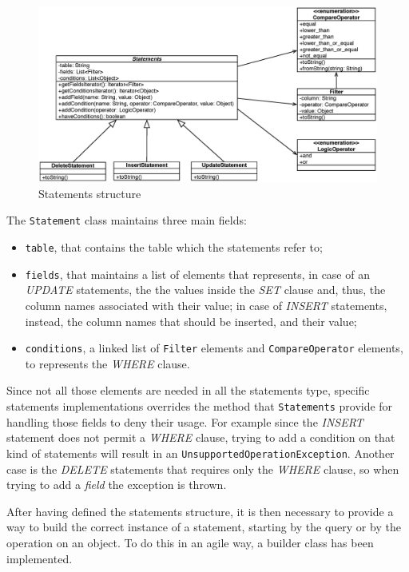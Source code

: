 \begin{figure}[tbh]
  \centering
  \includegraphics[width=13cm]{images/statements}
  \caption{Statements structure}
  \label{fig:statements}
\end{figure} 

\noindent The \texttt{Statement} class maintains three main fields:
\begin{itemize}
\item \texttt{table}, that contains the table which the statements refer to;
\item \texttt{fields}, that maintains a list of elements that represents, in case of an \textit{UPDATE} statements, the the values inside the \textit{SET} clause and, thus, the column names associated with their value; in case of \textit{INSERT} statements, instead, the column names that should be inserted, and their value;
\item \texttt{conditions}, a linked list of \texttt{Filter} elements and \texttt{CompareOperator} elements, to represents the \textit{WHERE} clause.
\end{itemize} 

\noindent Since not all those elements are needed in all the statements type, specific statements implementations overrides the method that \texttt{Statements} provide for handling those fields to deny their usage. For example since the \textit{INSERT} statement does not permit a \textit{WHERE} clause, trying to add a condition on that kind of statements will result in an \texttt{UnsupportedOperationException}. Another case is the \textit{DELETE} statements that requires only the \textit{WHERE} clause, so when trying to add a \textit{field} the exception is thrown.

\newparagraph After having defined the statements structure, it is then necessary to provide a way to build the correct instance of a statement, starting by the query or by the operation on an object.
To do this in an agile way, a builder class has been implemented.

